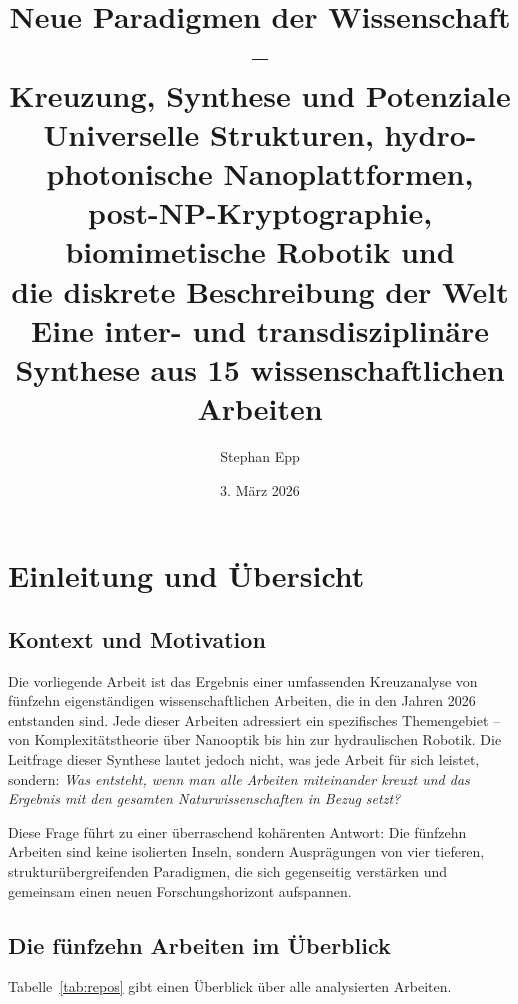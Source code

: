﻿\documentclass[a4paper,12pt]{scrreprt}
\title{%
  \textbf{Neue Paradigmen der Wissenschaft --}\\
  \textbf{Kreuzung, Synthese und Potenziale}\\[0.8em]
  \large Universelle Strukturen, hydro-photonische Nanoplattformen,\\
  post-NP-Kryptographie, biomimetische Robotik und\\
  die diskrete Beschreibung der Welt\\[1em]
  \normalsize Eine inter- und transdisziplinäre Synthese aus 15 wissenschaftlichen
  Arbeiten
}
\author{Stephan Epp}
\date{3. März 2026}
\theoremstyle{definition}
\begin{document}
\maketitle
\newpage
\tableofcontents
\newpage

\section{Einleitung und Übersicht}
\label{sec:einleitung}

\subsection{Kontext und Motivation}

Die vorliegende Arbeit ist das Ergebnis einer umfassenden Kreuzanalyse von
fünfzehn eigenständigen wissenschaftlichen Arbeiten, die in den Jahren
2026 entstanden sind. Jede dieser Arbeiten adressiert ein spezifisches
Themengebiet -- von Komplexitätstheorie über Nanooptik bis hin zur
hydraulischen Robotik. Die Leitfrage dieser Synthese lautet jedoch nicht,
was jede Arbeit für sich leistet, sondern: \emph{Was entsteht, wenn man
alle Arbeiten miteinander kreuzt und das Ergebnis mit den gesamten
Naturwissenschaften in Bezug setzt?}

Diese Frage führt zu einer überraschend kohärenten Antwort: Die fünfzehn
Arbeiten sind keine isolierten Inseln, sondern Ausprägungen von vier
tieferen, strukturübergreifenden Paradigmen, die sich gegenseitig
verstärken und gemeinsam einen neuen Forschungshorizont aufspannen.

\subsection{Die fünfzehn Arbeiten im Überblick}

Tabelle~\ref{tab:repos} gibt einen Überblick über alle analysierten Arbeiten.
\end{document}
